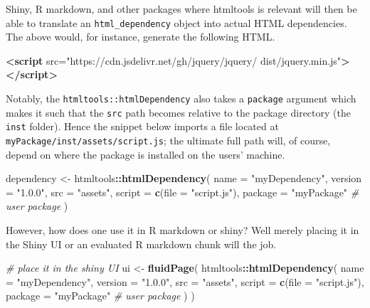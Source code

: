 \documentclass[10pt,]{krantz}
\makeatletter
\newenvironment{Shaded}{\begin{snugshade}}{\end{snugshade}}
\newcommand{\CommentTok}[1]{\textcolor[rgb]{0.37,0.37,0.37}{\textit{#1}}}
\newcommand{\DataTypeTok}[1]{\textcolor[rgb]{0.27,0.27,0.27}{#1}}
\newcommand{\KeywordTok}[1]{\textcolor[rgb]{0.27,0.27,0.27}{\textbf{#1}}}
\newcommand{\NormalTok}[1]{#1}
\newcommand{\OperatorTok}[1]{\textcolor[rgb]{0.43,0.43,0.43}{\textbf{#1}}}
\newcommand{\OtherTok}[1]{\textcolor[rgb]{0.37,0.37,0.37}{#1}}
\newcommand{\StringTok}[1]{\textcolor[rgb]{0.5,0.5,0.5}{#1}}
\newenvironment{kframe}{%
\medskip{}
\setlength{\fboxsep}{.8em}
 \def\at@end@of@kframe{}%
 \ifinner\ifhmode%
  \def\at@end@of@kframe{\end{minipage}}%
  \begin{minipage}{\columnwidth}%
 \fi\fi%
 \def\FrameCommand##1{\hskip\@totalleftmargin \hskip-\fboxsep
 \colorbox{shadecolor}{##1}\hskip-\fboxsep
     \hskip-\linewidth \hskip-\@totalleftmargin \hskip\columnwidth}%
 \MakeFramed {\advance\hsize-\width
   \@totalleftmargin\z@ \linewidth\hsize
   \@setminipage}}%
 {\par\unskip\endMakeFramed%
 \at@end@of@kframe}
\renewenvironment{Shaded}{\begin{kframe}}{\end{kframe}}
\makeatother
\begin{document}
Shiny, R markdown, and other packages where htmltools is relevant will then be able to translate an \texttt{html\_dependency} object into actual HTML dependencies. The above would, for instance, generate the following HTML.

\begin{Shaded}
\begin{Highlighting}[]
\KeywordTok{<script} 
\OtherTok{  src=}\StringTok{"https://cdn.jsdelivr.net/gh/jquery/jquery/}
\StringTok{    dist/jquery.min.js"}\KeywordTok{>}
\KeywordTok{</script>}
\end{Highlighting}
\end{Shaded}

Notably, the \texttt{htmltools::htmlDependency} also takes a \texttt{package} argument which makes it such that the \texttt{src} path becomes relative to the package directory (the \texttt{inst} folder). Hence the snippet below imports a file located at \texttt{myPackage/inst/assets/script.js}; the ultimate full path will, of course, depend on where the package is installed on the users' machine.

\begin{Shaded}
\begin{Highlighting}[]
\NormalTok{dependency <-}\StringTok{ }\NormalTok{htmltools}\OperatorTok{::}\KeywordTok{htmlDependency}\NormalTok{(}
  \DataTypeTok{name =} \StringTok{"myDependency"}\NormalTok{,}
  \DataTypeTok{version =} \StringTok{"1.0.0"}\NormalTok{,}
  \DataTypeTok{src =} \StringTok{"assets"}\NormalTok{,}
  \DataTypeTok{script =} \KeywordTok{c}\NormalTok{(}\DataTypeTok{file =} \StringTok{"script.js"}\NormalTok{),}
  \DataTypeTok{package =} \StringTok{"myPackage"} \CommentTok{# user package}
\NormalTok{)}
\end{Highlighting}
\end{Shaded}

However, how does one use it in R markdown or shiny? Well merely placing it in the Shiny UI or an evaluated R markdown chunk will the job.

\begin{Shaded}
\begin{Highlighting}[]
\CommentTok{# place it in the shiny UI}
\NormalTok{ui <-}\StringTok{ }\KeywordTok{fluidPage}\NormalTok{(}
\NormalTok{  htmltools}\OperatorTok{::}\KeywordTok{htmlDependency}\NormalTok{(}
    \DataTypeTok{name =} \StringTok{"myDependency"}\NormalTok{,}
    \DataTypeTok{version =} \StringTok{"1.0.0"}\NormalTok{,}
    \DataTypeTok{src =} \StringTok{"assets"}\NormalTok{,}
    \DataTypeTok{script =} \KeywordTok{c}\NormalTok{(}\DataTypeTok{file =} \StringTok{"script.js"}\NormalTok{),}
    \DataTypeTok{package =} \StringTok{"myPackage"} \CommentTok{# user package}
\NormalTok{  )}
\NormalTok{)}
\end{Highlighting}
\end{Shaded}
\end{document}
